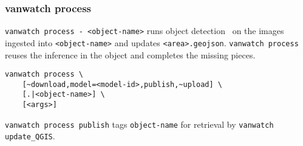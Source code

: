 \subsubsection{vanwatch process}
\label{vanwatch_process}

\texttt{vanwatch process - <object-name>} runs object detection~ on the images ingested into \texttt{<object-name>} and updates \texttt{<area>.geojson}. \texttt{vanwatch process} reuses the inference in the object and completes the missing pieces.
%
\begin{verbatim}
vanwatch process \
    [~download,model=<model-id>,publish,~upload] \
    [.|<object-name>] \
    [<args>]
\end{verbatim}
%
\texttt{vanwatch process publish} tags \texttt{object-name} for retrieval by \texttt{vanwatch update\_QGIS}.